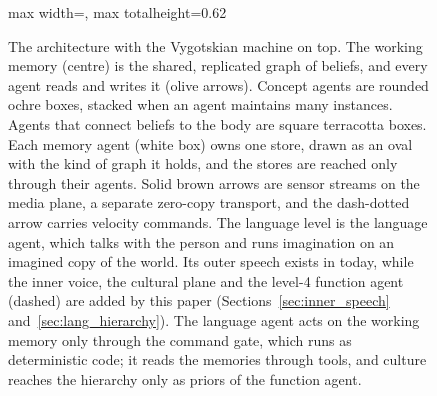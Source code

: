 \begin{figure}[!t]
\begin{adjustbox}{max width=\textwidth, max totalheight=0.62\textheight}
\end{adjustbox}
\caption{The \cortex{} architecture with the Vygotskian machine on top. The working memory (centre) is the shared,
replicated graph of beliefs, and every agent reads and writes it (olive arrows). Concept agents are rounded ochre boxes,
stacked when an agent maintains many instances. Agents that connect beliefs to the body are square terracotta boxes.
Each memory agent (white box) owns one store, drawn as an oval with the kind of graph it holds, and the stores are
reached only through their agents. Solid brown arrows are sensor streams on the media plane, a separate zero-copy
transport, and the dash-dotted arrow carries velocity commands. The language level is the language agent, which
talks with the person and runs imagination on an imagined copy of the world. Its outer speech exists in \cortex{}
today, while the inner voice, the cultural plane and the level-4 function agent (dashed) are added by this paper
(Sections~\ref{sec:inner_speech} and~\ref{sec:lang_hierarchy}). The language agent acts on the working memory only
through the command gate, which runs as deterministic code; it reads the memories through tools, and culture reaches
the hierarchy only as priors of the function agent.}
\label{fig:cortex_overview}
\end{figure}

